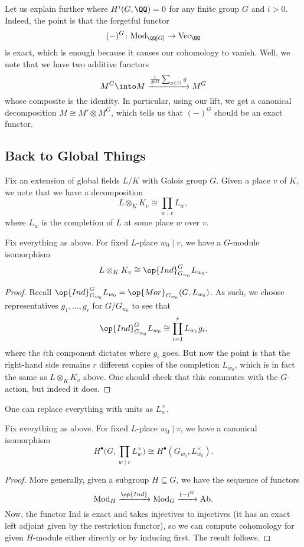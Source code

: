 \documentclass[../notes.tex]{subfiles}
\begin{document}
\begin{remark}
	Let us explain further where $H^i(G,\QQ)=0$ for any finite group $G$ and $i>0$. Indeed, the point is that the forgetful functor
	\[(-)^G\colon\mathrm{Mod}_{\QQ[G]}\to\mathrm{Vec}_\QQ\]
	is exact, which is enough because it causes our cohomology to vanish. Well, we note that we have two additive functors
	\[M^G\into M\xrightarrow{\frac1{\#G}\sum_{g\in G}g}M^G\]
	whose composite is the identity. In particular, using our lift, we get a canonical decomposition $M\cong M'\otimes M^G$, which tells us that $(-)^G$ should be an exact functor.
\end{remark}

\subsection{Back to Global Things}
Fix an extension of global fields $L/K$ with Galois group $G$. Given a place $v$ of $K$, we note that we have a decomposition
\[L\otimes_KK_v\cong\prod_{w\mid v}L_w,\]
where $L_w$ is the completion of $L$ at some place $w$ over $v$.
\begin{proposition}
	Fix everything as above. For fixed $L$-place $w_0\mid v$, we have a $G$-module isomorphism
	\[L\otimes_KK_v\cong\op{Ind}_{G_{w_0}}^GL_{w_0}.\]
\end{proposition}
\begin{proof}
	Recall $\op{Ind}_{G_{w_0}}^GL_{w_0}=\op{Mor}_{G_{w_0}}(G,L_{w_0})$. As such, we choose representatives $g_1,\ldots,g_r$ for $G/G_{w_0}$ to see that
	\[\op{Ind}_{G_{w_0}}^GL_{w_0}\cong\prod_{i=1}^rL_{w_0}g_i,\]
	where the $i$th component dictates where $g_i$ goes. But now the point is that the right-hand side remains $r$ different copies of the completion $L_{w_0}$, which is in fact the same as $L\otimes_KK_v$ above. One should check that this commutes with the $G$-action, but indeed it does.
\end{proof}
\begin{remark}
	One can replace everything with units as $L_w^\times$.
\end{remark}
\begin{corollary}
	Fix everything as above. For fixed $L$-place $w_0\mid v$, we have a canonical isomorphism
	\[H^\bullet\Bigg(G,\prod_{w\mid v}L_w^\times\Bigg)\cong H^\bullet(G_{w_0},L_{w_0}^\times).\]
\end{corollary}
\begin{proof}
	More generally, given a subgroup $H\subseteq G$, we have the sequence of functors
	\[\mathrm{Mod}_H\xrightarrow{\op{Ind}}\mathrm{Mod}_G\xrightarrow{(-)^G}\mathrm{Ab}.\]
	Now, the functor $\mathrm{Ind}$ is exact and takes injectives to injectives (it has an exact left adjoint given by the restriction functor), so we can compute cohomology for given $H$-module either directly or by inducing first. The result follows.
\end{proof}
\end{document}
